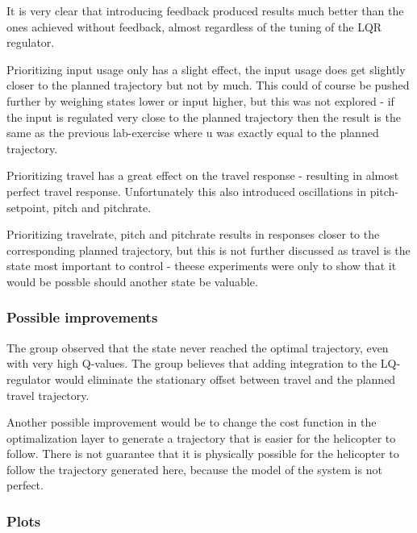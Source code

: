 \documentclass[../main.tex]{subfiles}
\begin{document}
It is very clear that introducing feedback produced results much better than the ones achieved without feedback, almost regardless of the tuning of the LQR regulator.

Prioritizing input usage only has a slight effect, the input usage does get slightly closer to the planned trajectory but not by much. This could of course be pushed further by weighing states lower or input higher, but this was not explored - if the input is regulated very close to the planned trajectory then the result is the same as the previous lab-exercise where u was exactly equal to the planned trajectory.

Prioritizing travel has a great effect on the travel response - resulting in almost perfect travel response. Unfortunately this also introduced oscillations in pitch-setpoint, pitch and pitchrate.

Prioritizing travelrate, pitch and pitchrate results in responses closer to the corresponding planned trajectory, but this is not further discussed as travel is the state most important to control - theese experiments were only to show that it would be possble should another state be valuable.

\subsubsection{Possible improvements}
The group observed that the state never reached the optimal trajectory, even with very high Q-values. The group believes that adding integration to the LQ-regulator would eliminate the stationary offset between travel and the planned travel trajectory.

Another possible improvement would be to change the cost function in the optimalization layer to generate a trajectory that is easier for the helicopter to follow. There is not guarantee that it is physically possible for the helicopter to follow the trajectory generated here, because the model of the system is not perfect.

\subsubsection{Plots}
\end{document}

